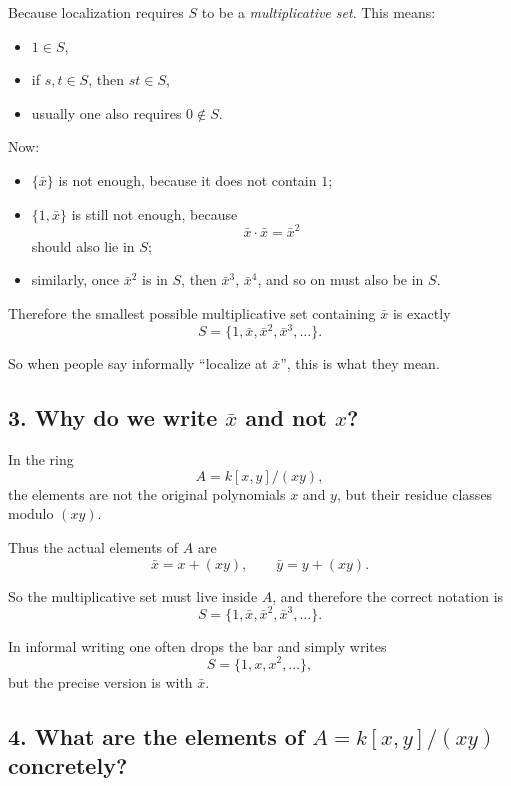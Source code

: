 \documentclass[12pt,a4paper]{article}
\theoremstyle{notespace}
\begin{document}
Because localization requires \(S\) to be a \emph{multiplicative set}. This means:

\begin{itemize}
	\item \(1\in S\),
	\item if \(s,t\in S\), then \(st\in S\),
	\item usually one also requires \(0\notin S\).
\end{itemize}

Now:

\begin{itemize}
	\item \(\{\bar x\}\) is not enough, because it does not contain \(1\);
	\item \(\{1,\bar x\}\) is still not enough, because
	\[
	\bar x\cdot \bar x=\bar x^2
	\]
	should also lie in \(S\);
	\item similarly, once \(\bar x^2\) is in \(S\), then \(\bar x^3\), \(\bar x^4\), and so on must also be in \(S\).
\end{itemize}

Therefore the smallest possible multiplicative set containing \(\bar x\) is exactly
\[
S=\{1,\bar x,\bar x^2,\bar x^3,\dots\}.
\]

So when people say informally ``localize at \(\bar x\)'', this is what they mean.

\subsection*{3. Why do we write \(\bar x\) and not \(x\)?}

In the ring
\[
A=k[x,y]/(xy),
\]
the elements are not the original polynomials \(x\) and \(y\), but their residue classes modulo \((xy)\).

Thus the actual elements of \(A\) are
\[
\bar x=x+(xy), \qquad \bar y=y+(xy).
\]

So the multiplicative set must live inside \(A\), and therefore the correct notation is
\[
S=\{1,\bar x,\bar x^2,\bar x^3,\dots\}.
\]

In informal writing one often drops the bar and simply writes
\[
S=\{1,x,x^2,\dots\},
\]
but the precise version is with \(\bar x\).

\subsection*{4. What are the elements of \(A=k[x,y]/(xy)\) concretely?}
\end{document}
